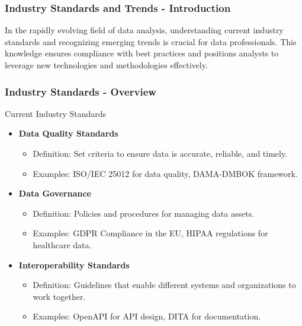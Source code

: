 \documentclass[aspectratio=169]{beamer}
\begin{document}
\begin{frame}[fragile]
    \frametitle{Industry Standards and Trends - Introduction}
    In the rapidly evolving field of data analysis, understanding current industry standards and recognizing emerging trends is crucial for data professionals. 
    This knowledge ensures compliance with best practices and positions analysts to leverage new technologies and methodologies effectively.
\end{frame}

\begin{frame}[fragile]
    \frametitle{Industry Standards - Overview}
    \begin{block}{Current Industry Standards}
        \begin{itemize}
            \item \textbf{Data Quality Standards} 
            \begin{itemize}
                \item Definition: Set criteria to ensure data is accurate, reliable, and timely.
                \item Examples: ISO/IEC 25012 for data quality, DAMA-DMBOK framework.
            \end{itemize}

            \item \textbf{Data Governance}
            \begin{itemize}
                \item Definition: Policies and procedures for managing data assets.
                \item Examples: GDPR Compliance in the EU, HIPAA regulations for healthcare data.
            \end{itemize}

            \item \textbf{Interoperability Standards}
            \begin{itemize}
                \item Definition: Guidelines that enable different systems and organizations to work together.
                \item Examples: OpenAPI for API design, DITA for documentation.
            \end{itemize}
        \end{itemize}
    \end{block}
\end{frame}
\end{document}
